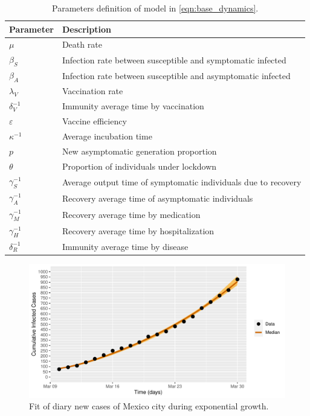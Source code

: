 \documentclass[a4paper,10pt]{amsart}
\begin{document}
         \begin{table}[h!]
    \begin{tabular}{>{\centering}p{}p{}}
			\toprule
			Parameter & Description
      \\
      \midrule
			$\mu$ &  
				Death rate
			\\
            $\beta_S$ & 
            	Infection rate between susceptible and symptomatic infected
			\\
            $\beta_A$ & 
            	Infection rate between susceptible and asymptomatic infected
			\\
            $\lambda_V$ & 
            	Vaccination rate
			\\
            $\delta_{V}^{-1}$ & 
            	Immunity average time by vaccination
			\\
            $\varepsilon$ &  
            	Vaccine efficiency
			\\
            $\kappa^{-1}$ & 
            	Average incubation time   
            \\
			$p$ & 
				New asymptomatic generation proportion  
			\\			
		    $\theta$ & 
            	Proportion of individuals under lockdown 
            \\ 
            $\gamma_{S}^{-1}$ &  
            	Average output time of symptomatic individuals due to recovery
            \\
			$\gamma_{A}^{-1}$ & 
				Recovery average time of asymptomatic individuals  
			\\
			$\gamma_{M}^{-1}$ & 
				Recovery average time by medication
			\\
			$\gamma_{H}^{-1}$ & 
				Recovery average time by hospitalization
			\\ 					 
            
            $\delta_{R}^{-1}$ &  
            	Immunity average time by disease 
            \\
      	\bottomrule
		\end{tabular}
  		\caption{
  			Parameters definition of model in 
  			\cref{eqn:base_dynamics}.}\label{table1}
	\end{table}

        \begin{figure}[htb]
        	\includegraphics[width=\textwidth]{./cdmx_CIs_data_begining_fit}
        	\caption{%
        		Fit of diary new cases of Mexico city
        		during exponential growth.
        	}
        \end{figure}
\end{document}

